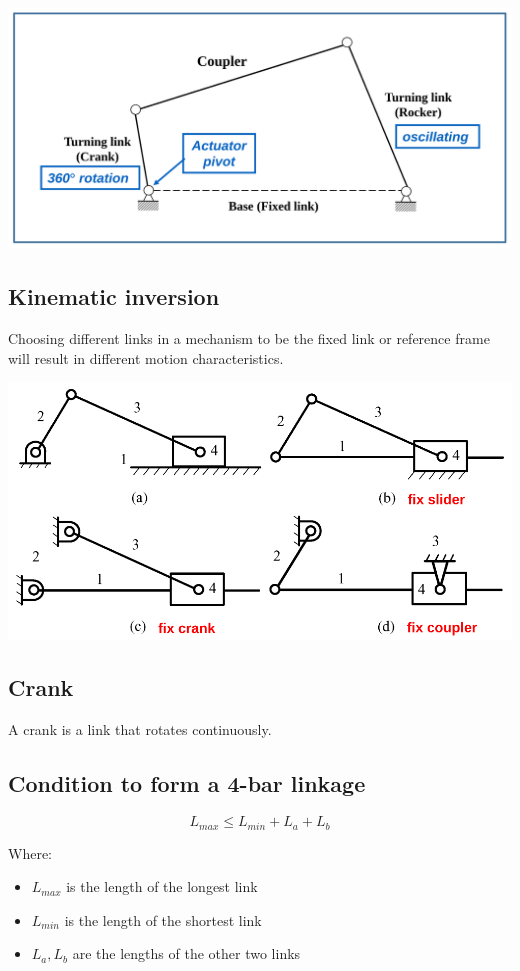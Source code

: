 \documentclass[11pt]{article}
\begin{document}
\begin{center}
\includegraphics[width=.9\linewidth]{./images/naming-convention.png}
\end{center}

 \newpage
\subsection{Kinematic inversion}
\label{sec:orgd425955}
Choosing different links in a mechanism to be the fixed link or reference frame will result in different motion characteristics.

\begin{center}
\includegraphics[width=.9\linewidth]{./images/kinematic-inversion-diagram.png}
\end{center}
\subsection{Crank}
\label{sec:orgd7ba758}
A crank is a link that rotates continuously.
\subsection{Condition to form a 4-bar linkage}
\label{sec:org86810f2}
\[L_{max} \le L_{min} + L_a + L_b\]

Where:
\begin{itemize}
\item \(L_{max}\) is the length of the longest link
\item \(L_{min}\) is the length of the shortest link
\item \(L_a, L_b\) are the lengths of the other two links
\end{itemize}
\end{document}
